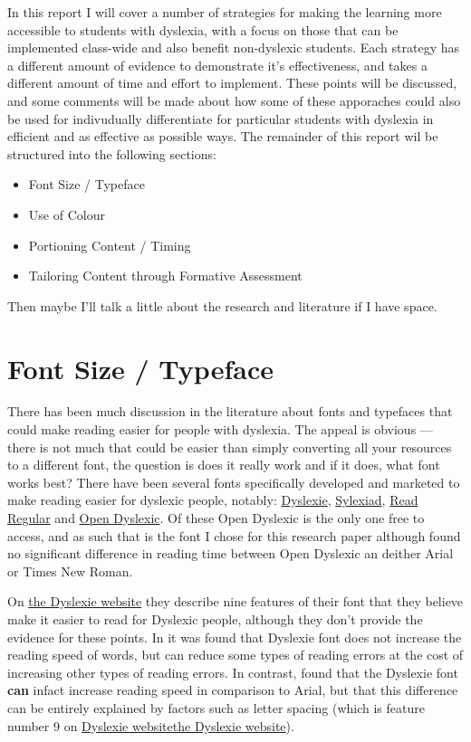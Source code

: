 \documentclass[17pt]{memoir}
\begin{document}
In this report I will cover a number of strategies for making the learning more accessible to students with dyslexia, with a focus on those that can be implemented class-wide and also benefit non-dyslexic students. Each strategy has a different amount of evidence to demonstrate it's effectiveness, and takes a different amount of time and effort to implement. These points will be discussed, and some comments will be made about how some of these apporaches could also be used for indivudually differentiate for particular students with dyslexia in efficient and as effective as possible ways. The remainder of this report wil be structured into the following sections:
\begin{itemize}
	\item Font Size / Typeface
	\item Use of Colour
	\item Portioning Content / Timing
	\item Tailoring Content through Formative Assessment
\end{itemize}

Then maybe I'll talk a little about the research and literature if I have space.

\section*{Font Size / Typeface}

There has been much discussion in the literature about fonts and typefaces that could make reading easier for people with dyslexia. The appeal is obvious --- there is not much that could be easier than simply converting all your resources to a different font, the question is does it really work and if it does, what font works best? There have been several fonts specifically developed and marketed to make reading easier for dyslexic people, notably: \href{https://www.dyslexiefont.com/en/typeface/}{Dyslexie}, \href{http://www.robsfonts.com/fonts/sylexiad}{Sylexiad}, \href{http://www.readregular.com/english/intro.html}{Read Regular} and \href{https://www.opendyslexic.org/}{Open Dyslexic}. Of these Open Dyslexic is the only one free to access, and as such that is the font I chose for this research paper although \cite{Wery2017} found no significant difference in reading time between Open Dyslexic an deither Arial or Times New Roman. 

On \href{https://www.dyslexiefont.com/en/typeface/}{the Dyslexie website} they describe nine features of their font that they believe make it easier to read for Dyslexic people, although they don't provide the evidence for these points. In \cite{Leeuw2010} it was found that Dyslexie font does not increase the reading speed of words, but can reduce some types of reading errors at the cost of increasing other types of reading errors. In contrast, \cite{Marinus2016} found that the Dyslexie font \textbf{can} infact increase reading speed in comparison to Arial, but that this difference can be entirely explained by factors such as letter spacing (which is feature number 9 on \href{https://www.dyslexiefont.com/en/typeface/}{Dyslexie website}\href{https://www.dyslexiefont.com/en/typeface/}{the Dyslexie website}). 
\end{document}
